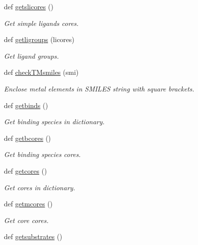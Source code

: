 \begin{DoxyCompactItemize}
def \hyperlink{namespacemolSimplify_1_1Scripts_1_1io_a1207fa1422beb3ec6f879ebeeef7096f}{getslicores} ()
\begin{DoxyCompactList}\small\item\em Get simple ligands cores. \end{DoxyCompactList}\item 
def \hyperlink{namespacemolSimplify_1_1Scripts_1_1io_a8ff3ee822809c0232ea5fa3573906b28}{getligroups} (licores)
\begin{DoxyCompactList}\small\item\em Get ligand groups. \end{DoxyCompactList}\item 
def \hyperlink{namespacemolSimplify_1_1Scripts_1_1io_afea58c49aad8ec19954d2e01b9db0ee8}{check\+T\+Msmiles} (smi)
\begin{DoxyCompactList}\small\item\em Enclose metal elements in S\+M\+I\+L\+ES string with square brackets. \end{DoxyCompactList}\item 
def \hyperlink{namespacemolSimplify_1_1Scripts_1_1io_ae69fc7bad48abf6eb335f271eb1dd68c}{getbinds} ()
\begin{DoxyCompactList}\small\item\em Get binding species in dictionary. \end{DoxyCompactList}\item 
def \hyperlink{namespacemolSimplify_1_1Scripts_1_1io_aaa2e5af12673a509d53b353f7aa79d2c}{getbcores} ()
\begin{DoxyCompactList}\small\item\em Get binding species cores. \end{DoxyCompactList}\item 
def \hyperlink{namespacemolSimplify_1_1Scripts_1_1io_ac64e78f365020a88b30902f3b6aba5d2}{getcores} ()
\begin{DoxyCompactList}\small\item\em Get cores in dictionary. \end{DoxyCompactList}\item 
def \hyperlink{namespacemolSimplify_1_1Scripts_1_1io_a1d772b9f3c7f695c106e60ff2564f6a5}{getmcores} ()
\begin{DoxyCompactList}\small\item\em Get core cores. \end{DoxyCompactList}\item 
def \hyperlink{namespacemolSimplify_1_1Scripts_1_1io_aacb8edd728a1907336e0201ec232446f}{getsubstrates} ()

\end{DoxyCompactItemize}
